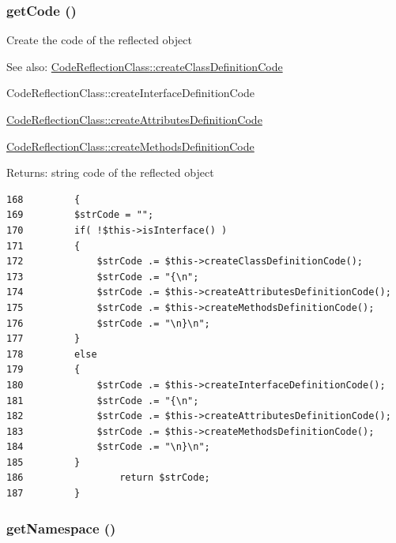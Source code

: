 \hypertarget{class_code_reflection_class_b5e24da53b4a0d0848b18c1e832f47ff}{
\subsubsection[{getCode}]{\setlength{\rightskip}{0pt plus 5cm}getCode ()}}
\label{class_code_reflection_class_b5e24da53b4a0d0848b18c1e832f47ff}


Create the code of the reflected object

\begin{Desc}
\item[See also:]\hyperlink{class_code_reflection_class_98b016c8a77c458803bb6905c89c914b}{CodeReflectionClass::createClassDefinitionCode} 

CodeReflectionClass::createInterfaceDefinitionCode 

\hyperlink{class_code_reflection_class_72b25801f6d2c909af2ee16b2b51ab8f}{CodeReflectionClass::createAttributesDefinitionCode} 

\hyperlink{class_code_reflection_class_c2d23f8614e24561b794d5031001eaf8}{CodeReflectionClass::createMethodsDefinitionCode} \end{Desc}
\begin{Desc}
\item[Returns:]string code of the reflected object \end{Desc}


\begin{Code}\begin{verbatim}168         {
169         $strCode = "";
170         if( !$this->isInterface() )
171         {
172             $strCode .= $this->createClassDefinitionCode();
173             $strCode .= "{\n";
174             $strCode .= $this->createAttributesDefinitionCode();
175             $strCode .= $this->createMethodsDefinitionCode();
176             $strCode .= "\n}\n";
177         }
178         else
179         {
180             $strCode .= $this->createInterfaceDefinitionCode();
181             $strCode .= "{\n";
182             $strCode .= $this->createAttributesDefinitionCode();
183             $strCode .= $this->createMethodsDefinitionCode();
184             $strCode .= "\n}\n";
185         }
186                 return $strCode;
187         }
\end{verbatim}
\end{Code}


\hypertarget{class_code_reflection_class_2614df64646ac71b70b1e1074258052b}{
\subsubsection[{getNamespace}]{\setlength{\rightskip}{0pt plus 5cm}getNamespace ()}}
\label{class_code_reflection_class_2614df64646ac71b70b1e1074258052b}



